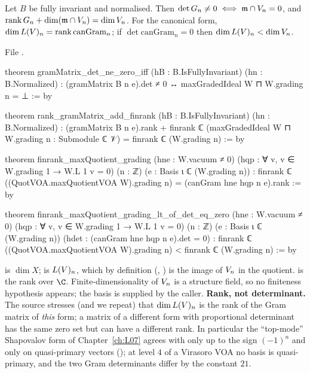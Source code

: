 \begin{theorem}\label{l04:thm:gram}
Let $B$ be fully invariant and normalised. Then $\det G_n\ne0\iff\mathfrak{m}\cap V_n = 0$, and
$\operatorname{rank}G_n+\dim(\mathfrak{m}\cap V_n) = \dim V_n$. For the canonical form,
$\dim L(V)_n = \operatorname{rank}\mathrm{canGram}_n$; if $\det\mathrm{canGram}_n = 0$ then $\dim L(V)_n<
\dim V_n$.
\end{theorem}
\noindent File .
\begin{leancode}
theorem gramMatrix_det_ne_zero_iff (hB : B.IsFullyInvariant) (hn : B.Normalized) :
    (gramMatrix B n e).det ≠ 0 ↔ maxGradedIdeal W ⊓ W.grading n = ⊥ := by

theorem rank_gramMatrix_add_finrank (hB : B.IsFullyInvariant) (hn : B.Normalized) :
    (gramMatrix B n e).rank + finrank ℂ (maxGradedIdeal W ⊓ W.grading n : Submodule ℂ 𝒱)
      = finrank ℂ (W.grading n) := by

theorem finrank_maxQuotient_grading (hne : W.vacuum ≠ 0)
    (hqp : ∀ v, v ∈ W.grading 1 → W.L 1 v = 0) (n : ℤ) (e : Basis ι ℂ (W.grading n)) :
    finrank ℂ ((QuotVOA.maxQuotientVOA W).grading n) = (canGram hne hqp n e).rank := by

theorem finrank_maxQuotient_grading_lt_of_det_eq_zero (hne : W.vacuum ≠ 0)
    (hqp : ∀ v, v ∈ W.grading 1 → W.L 1 v = 0) (n : ℤ) (e : Basis ι ℂ (W.grading n))
    (hdet : (canGram hne hqp n e).det = 0) :
    finrank ℂ ((QuotVOA.maxQuotientVOA W).grading n) < finrank ℂ (W.grading n) := by
\end{leancode}
\begin{dictionary}
 is $\dim X$;  is $L(V)_n$, which by
definition (\allowbreak{}\allowbreak{}, ) is the image of $V_n$ in the quotient.
 is the rank over $\C$. Finite-dimensionality of $V_n$ is a structure field, so no
finiteness hypothesis appears; the basis  is supplied by the caller. \textbf{Rank, not
determinant.} The source stresses (and we repeat) that $\dim L(V)_n$ is the rank of the Gram matrix of
\emph{this} form; a matrix of a different form with proportional determinant has the same zero set but
can have a different rank. In particular the ``top-mode'' Shapovalov form \allowbreak{} of
Chapter~\ref{ch:L07} agrees with  only up to the sign $(-1)^n$ and only on quasi-primary
vectors (\allowbreak{}\allowbreak{}\allowbreak{}\allowbreak{}\allowbreak{}); at level $4$ of a Virasoro VOA no basis is
quasi-primary, and the two Gram determinants differ by the constant $21$.
\end{dictionary}
